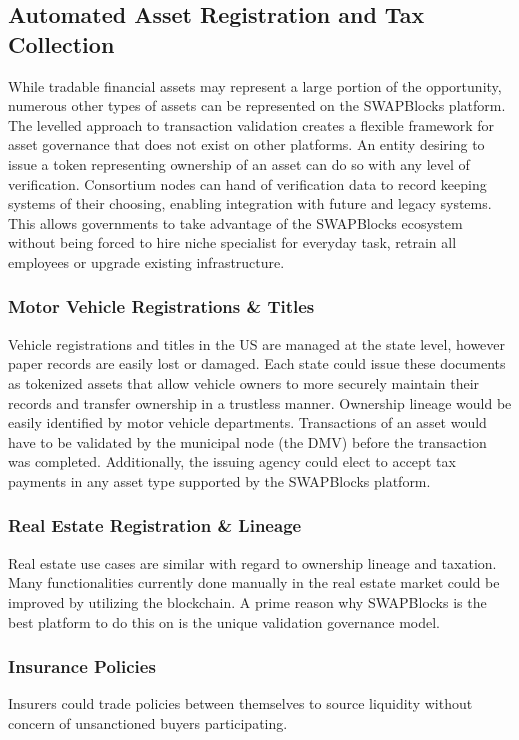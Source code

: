 \documentclass[12pt]{article}
\begin{document}
\subsection{Automated Asset Registration and Tax Collection}

While tradable financial assets may represent a large portion of the opportunity, numerous other types of assets can be represented on the SWAPBlocks platform. The levelled approach to transaction validation creates a flexible framework for asset governance that does not exist on other platforms. An entity desiring to issue a token representing ownership of an asset can do so with any level of verification. Consortium nodes can hand of verification data to record keeping systems of their choosing, enabling integration with future and legacy systems.  This allows governments to take advantage of the SWAPBlocks ecosystem without being forced to hire niche specialist for everyday task, retrain all employees or upgrade existing infrastructure.

\subsubsection{Motor Vehicle Registrations \& Titles}
Vehicle registrations and titles in the US are managed at the state level, however paper records are easily lost or damaged. Each state could issue these documents as tokenized assets that allow vehicle owners to more securely maintain their records and transfer ownership in a trustless manner. Ownership lineage would be easily identified by motor vehicle departments. Transactions of an asset would have to be validated by the municipal node (the DMV) before the transaction was completed. Additionally, the issuing agency could elect to accept tax payments in any asset type supported by the SWAPBlocks platform.

\subsubsection{Real Estate Registration \& Lineage}
Real estate use cases are similar with regard to ownership lineage and taxation. Many functionalities currently done manually in the real estate market could be improved by utilizing the blockchain. A prime reason why SWAPBlocks is the best platform to do this on is the unique validation governance model.

\subsubsection{Insurance Policies}
Insurers could trade policies between themselves to source liquidity without concern of unsanctioned buyers participating.
\end{document}
